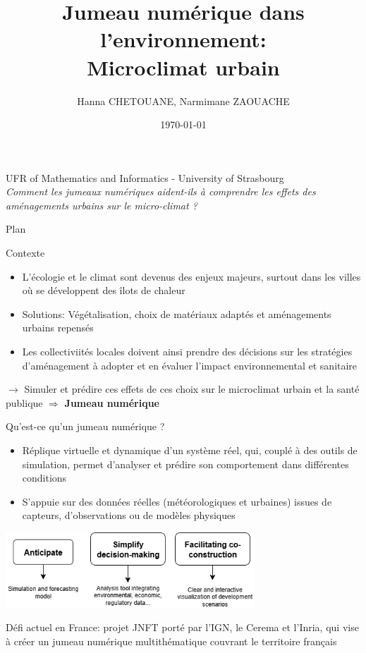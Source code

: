 \documentclass{beamer}
\author[Jumeau numérique: Environnement]{\large Hanna CHETOUANE, Narmimane ZAOUACHE \\ \vspace{-0.8cm} \date{\today}}
\title[Microclimat urbain]{\textbf{Jumeau numérique dans l'environnement:} \\ Microclimat urbain}
\begin{document}
\begin{frame}
    \titlepage
    \vspace{-0.4cm}
    \begin{center}
        UFR of Mathematics and Informatics - University of Strasbourg 
        \\[0.2cm] 
        \textit{Comment les jumeaux numériques aident-ils à comprendre les effets des aménagements urbains sur le micro-climat ?}
    \end{center}
\end{frame} 


\begin{frame}{Plan}
    \tableofcontents    
\end{frame}


\begin{frame}{Contexte}
    \small
    \begin{itemize} %
        \item L'écologie et le climat sont devenus des enjeux majeurs, surtout dans les villes où se développent des îlots de chaleur
        \item Solutions: Végétalisation, choix de matériaux adaptés et aménagements urbains repensés
        \item Les collectiviités locales doivent ainsi prendre des décisions sur les stratégies d'aménagement à adopter et en évaluer l'impact environnemental et sanitaire
    \end{itemize}
    $\rightarrow$ Simuler et prédire ces effets de ces choix sur le microclimat urbain et la santé publique $\Rightarrow $ \textbf{Jumeau numérique}
\end{frame}


\begin{frame}{Qu'est-ce qu'un jumeau numérique ?}
    \small
    \begin{itemize}
        \item Réplique virtuelle et dynamique d'un système réel, qui, couplé à des outils de simulation, permet d'analyser et prédire son comportement dans différentes conditions
        \item S'appuie sur des données réelles (météorologiques et urbaines) issues de capteurs, d'observations ou de modèles physiques
    \end{itemize}
    \begin{center}
        \includegraphics[width=0.7\textwidth]{images/objectifs_jm.png} \\
    \end{center}
    Défi actuel en France: projet JNFT porté par l'IGN, le Cerema et l'Inria, qui vise à créer un jumeau numérique multithématique couvrant le territoire français
\end{frame}
\end{document}
